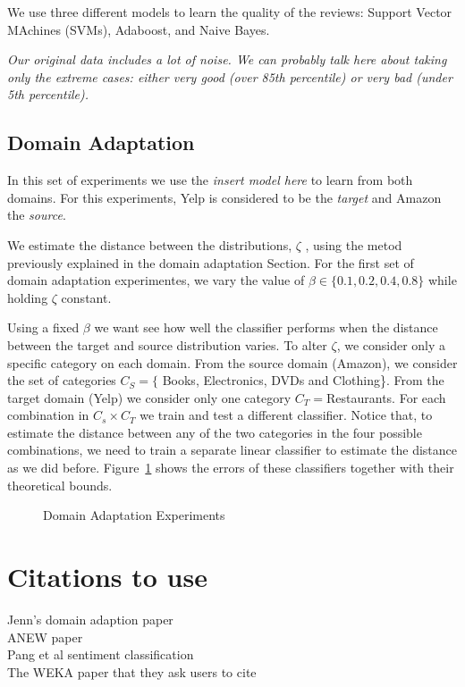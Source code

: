 \documentclass[letterpaper]{article}
\begin{document}
We use three different models to learn the quality of the reviews:
Support Vector MAchines (SVMs), Adaboost, and Naive Bayes.

\emph{Our original data includes a lot of noise. We can probably talk
  here about taking only the extreme cases: either very good (over
  85th percentile) or very bad (under 5th percentile).}

\subsection{Domain Adaptation}
\label{sec:domain-adaptation}

In this set of experiments we use the \emph{insert model here} to
learn from both domains. For this experiments, Yelp is considered to be
the \emph{target} and Amazon the \emph{source}.

We estimate the distance between the distributions, $\zeta$ , using the metod
previously explained in the domain adaptation Section. For the first
set of domain adaptation experimentes, we vary the value of $\beta \in
\{0.1, 0.2, 0.4, 0.8\}$ while holding $\zeta$ constant.

Using a fixed $\beta$ we want see how well the classifier performs
when the distance between the target and source distribution
varies. To alter $\zeta$, we consider only a specific category on each
domain. From the source domain (Amazon), we consider the set of
categories $C_S=\{$ Books, Electronics, DVDs and Clothing\}. From the
target domain (Yelp) we consider only one category
$C_T=${Restaurants}. For each combination in $C_s\times C_T$ we train
and test a different classifier. Notice that, to estimate the distance
between any of the two categories in the four possible combinations,
we need to train a separate linear classifier to estimate the distance
as we did before. Figure~\ref{fig:domain-adaptation} shows the errors
of these classifiers together with their theoretical bounds.

\begin{figure}
  \centering
  
  \caption{Domain Adaptation Experiments}
  \label{fig:domain-adaptation}
\end{figure}

\section{Citations to use}
Jenn's domain adaption paper \cite{JennLearnDiffDomains}\\
ANEW paper \cite{DoddsANEWPaper}\\
Pang et al sentiment classification \cite{PangSentimentClassification}\\
The WEKA paper that they ask users to cite \cite{weka} \\



\end{document}
